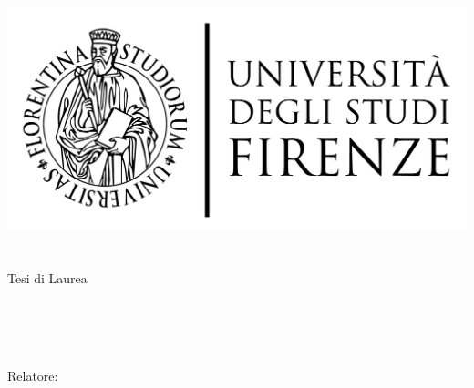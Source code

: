 \begin{titlepage}
    \begin{addmargin}[-1cm]{-3cm}
    \begin{center}
        \large
        \hfill
        \vfill

        \begingroup
            \includegraphics[scale=0.15]{img/LOGO}\\
            \myFaculty \\
            \myDegree \\
            \vspace{0.5cm}
            \vspace{0.5cm}
            Tesi di Laurea        
        \endgroup
        
        \vfill
        \begingroup
            \color{Maroon}\spacedallcaps{\myTitle} \\ $\ $\\
            \spacedallcaps{\myEnglishTitle} \\
            \bigskip
        \endgroup

        \spacedlowsmallcaps{\myName}
        \vfill
        \vfill
        Relatore: \emph{\myProf}\\
        \vfill
        \vfill
        \myTime
        \vfill
    \end{center}
  \end{addmargin}
\end{titlepage}
